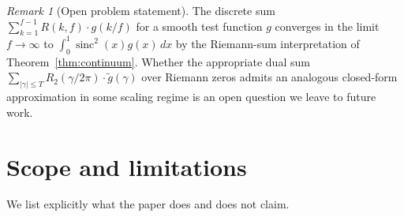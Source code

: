 \documentclass[11pt,reqno]{amsart}
\theoremstyle{plain}
\theoremstyle{definition}
\theoremstyle{remark}
\newtheorem{remark}[theorem]{Remark}
\DeclareMathOperator{\sinc}{sinc}
\begin{document}
\begin{remark}[Open problem statement]
\label{rem:open-bridge}
The discrete sum $\sum_{k = 1}^{f - 1} R(k, f) \cdot g(k / f)$
for a smooth test function $g$ converges in the limit $f \to \infty$
to $\int_0^1 \sinc^2(x) g(x)\, dx$ by the Riemann-sum interpretation
of Theorem~\ref{thm:continuum}. Whether the appropriate dual sum
$\sum_{|\gamma| \le T} R_2(\gamma / 2\pi) \cdot \tilde g(\gamma)$
over Riemann zeros admits an analogous closed-form approximation
in some scaling regime is an open question we leave to future work.
\end{remark}

\section{Scope and limitations}
\label{sec:scope}

We list explicitly what the paper does and does not claim.
\end{document}

